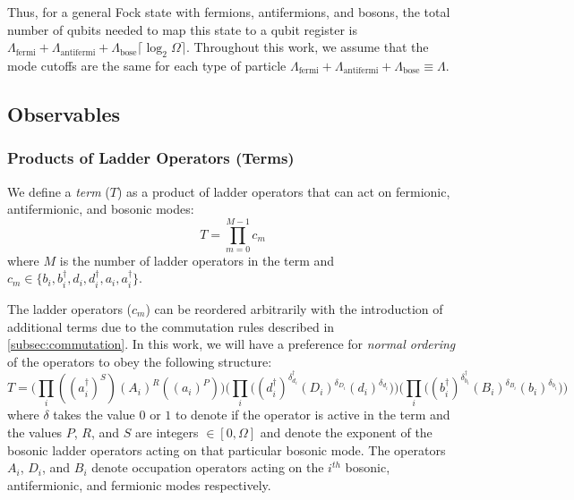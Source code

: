 Thus, for a general Fock state with fermions, antifermions, and bosons, the total number of qubits needed to map this state to a qubit register is $\Lambda_{\text{fermi}} + \Lambda_{\text{antifermi}} + \Lambda_{\text{bose}} \lceil \log_2{\Omega}\rceil$.
Throughout this work, we assume that the mode cutoffs are the same for each type of particle $\Lambda_{\text{fermi}} + \Lambda_{\text{antifermi}} + \Lambda_{\text{bose}} \equiv \Lambda$.






\subsection{Observables}
\label{subsec:observables}

\subsubsection{Products of Ladder Operators (Terms)}

We define a \textit{term} ($T$) as a product of ladder operators that can act on fermionic, antifermionic, and bosonic modes:
\begin{equation}
    T = \prod_{m=0}^{M-1} c_m
\end{equation}
where $M$ is the number of ladder operators in the term and $c_m \in \{b_i, b_i^\dagger, d_i, d_i^\dagger, a_i, a_i^\dagger\}$.

The ladder operators ($c_m$) can be reordered arbitrarily with the introduction of additional terms due to the commutation rules described in \ref{subsec:commutation}.
In this work, we will have a preference for \textit{normal ordering} of the operators to obey the following structure:
\begin{equation}
    T = \Big( \prod_i ((a_i^\dagger)^S)(A_i)^R((a_i)^P) \Big) \Big( \prod_i \big( (d_i^\dagger)^{\delta_{d_i}^{\dagger}} (D_i)^{\delta_{D_i}} (d_i)^{\delta_{d_i}} \big) \Big) \Big( \prod_i \big( (b_i^\dagger)^{\delta_{b_i}^{\dagger}} (B_i)^{\delta_{B_i}} (b_i)^{\delta_{b_i}} \big) \Big) 
\end{equation}
where $\delta$ takes the value $0$ or $1$ to denote if the operator is active in the term and the values $P$, $R$, and $S$ are integers $\in [0, \Omega]$ and denote the exponent of the bosonic ladder operators acting on that particular bosonic mode.
The operators $A_i$, $D_i$, and $B_i$ denote occupation operators acting on the $i^{th}$ bosonic, antifermionic, and fermionic modes respectively.

